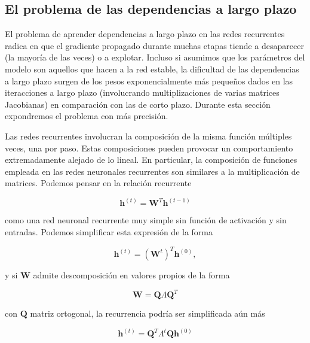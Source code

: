	\subsection{El problema de las dependencias a largo plazo}\label{dependenciaslargoplazo}
	
	El problema de aprender dependencias a largo plazo en las redes recurrentes radica en que el gradiente propagado durante muchas etapas tiende a desaparecer (la mayoría de las veces) o a explotar. Incluso si asumimos que los parámetros del modelo son aquellos que hacen a la red estable, la dificultad de las dependencias a largo plazo surgen de los pesos exponencialmente más pequeños dados en las iteracciones a largo plazo (involucrando multiplizaciones de varias matrices Jacobianas) en comparación con las de corto plazo. Durante esta sección expondremos el problema con más precisión.
	
	Las redes recurrentes involucran la composición de la misma función múltiples veces, una por paso. Estas composiciones pueden provocar un comportamiento extremadamente alejado de lo lineal. En particular, la composición de funciones empleada en las redes neuronales recurrentes son similares a la multiplicación de matrices. Podemos pensar en la relación recurrente 
	
	\begin{equation}
		\textbf{h}^{(t)} = \textbf{W}^T\textbf{h}^{(t-1)}
	\end{equation}
	
	como una red neuronal recurrente muy simple sin función de activación y sin entradas. Podemos simplificar esta expresión de la forma
	
	\begin{equation}
		\textbf{h}^{(t)} = (\textbf{W}^{t})^T\textbf{h}^{(0)},
	\end{equation}
	
	y si $\textbf{W}$ admite descomposición en valores propios de la forma
	
	\begin{equation}
		\textbf{W} = \textbf{Q} \Lambda \textbf{Q}^T
	\end{equation}
	
	con $\textbf{Q}$ matriz ortogonal, la recurrencia podría ser simplificada aún más
	
	\begin{equation}
		\textbf{h}^{(t)} = \textbf{Q}^T \Lambda^t \textbf{Q}\textbf{h}^{(0)}
	\end{equation}
	
